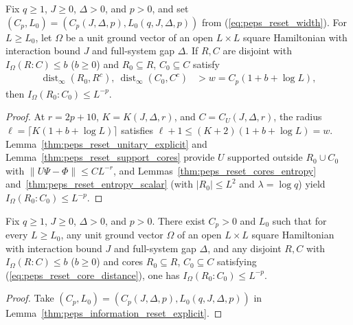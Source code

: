 \begin{lemma}
    \label{thm:peps_information_reset_explicit}
    \leanok
    Fix $q\ge1$, $J\ge0$, $\Delta>0$, and $p>0$, and set $(C_p,L_0)=(C_p(J,\Delta,p),L_0(q,J,\Delta,p))$ from (\ref{eq:peps_reset_width}). For $L\ge L_0$, let $\Omega$ be a unit ground vector of an open $L\times L$ square Hamiltonian with interaction bound $J$ and full-system gap $\Delta$. If $R,C$ are disjoint with $I_\Omega(R:C)\le b$ ($b\ge0$) and $R_0\subseteq R$, $C_0\subseteq C$ satisfy
    \begin{align}
        \operatorname{dist}_\infty(R_0,R^c),\ \operatorname{dist}_\infty(C_0,C^c)
         & >w=C_p(1+b+\log L),
        \label{eq:peps_reset_core_distance}
    \end{align}
    then $I_\Omega(R_0:C_0)\le L^{-p}$.
\end{lemma}
\begin{proof}
    \leanok
    At $r=2p+10$, $K=K(J,\Delta,r)$, and $C=C_U(J,\Delta,r)$, the radius $\ell=\lceil K(1+b+\log L)\rceil$ satisfies $\ell+1\le(K+2)(1+b+\log L)=w$. Lemma~\ref{thm:peps_reset_unitary_explicit} and Lemma~\ref{thm:peps_reset_support_cores} provide $U$ supported outside $R_0\cup C_0$ with $\|U\Psi-\Phi\|\le CL^{-r}$, and Lemmas~\ref{thm:peps_reset_cores_entropy} and~\ref{thm:peps_reset_entropy_scalar} (with $|R_0|\le L^2$ and $\lambda=\log q$) yield $I_\Omega(R_0:C_0)\le L^{-p}$.
\end{proof}

\begin{lemma}
    \label{thm:peps_information_reset}
    \leanok
    Fix $q\ge1$, $J\ge0$, $\Delta>0$, and $p>0$. There exist $C_p>0$ and $L_0$ such that for every $L\ge L_0$, any unit ground vector $\Omega$ of an open $L\times L$ square Hamiltonian with interaction bound $J$ and full-system gap $\Delta$, and any disjoint $R,C$ with $I_\Omega(R:C)\le b$ ($b\ge0$) and cores $R_0\subseteq R$, $C_0\subseteq C$ satisfying (\ref{eq:peps_reset_core_distance}), one has $I_\Omega(R_0:C_0)\le L^{-p}$.
\end{lemma}
\begin{proof}
    \leanok
    Take $(C_p,L_0)=(C_p(J,\Delta,p),L_0(q,J,\Delta,p))$ in Lemma~\ref{thm:peps_information_reset_explicit}.
\end{proof}

